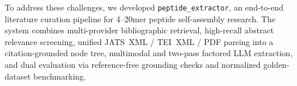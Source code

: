 To address these challenges, we developed \texttt{peptide\_extractor}, an end-to-end literature curation pipeline for 4--20mer peptide self-assembly research. The system combines multi-provider bibliographic retrieval, high-recall abstract relevance screening, unified JATS~XML / TEI~XML / PDF parsing into a citation-grounded node tree, multimodal and two-pass factored LLM extraction, and dual evaluation via reference-free grounding checks and normalized golden-dataset benchmarking.

